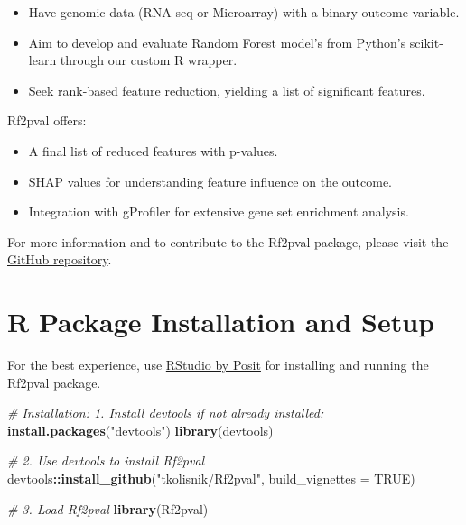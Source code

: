 \documentclass[
]{article}
\newenvironment{Shaded}{\begin{snugshade}}{\end{snugshade}}
\newcommand{\AttributeTok}[1]{\textcolor[rgb]{0.13,0.29,0.53}{#1}}
\newcommand{\CommentTok}[1]{\textcolor[rgb]{0.56,0.35,0.01}{\textit{#1}}}
\newcommand{\ConstantTok}[1]{\textcolor[rgb]{0.56,0.35,0.01}{#1}}
\newcommand{\FunctionTok}[1]{\textcolor[rgb]{0.13,0.29,0.53}{\textbf{#1}}}
\newcommand{\NormalTok}[1]{#1}
\newcommand{\SpecialCharTok}[1]{\textcolor[rgb]{0.81,0.36,0.00}{\textbf{#1}}}
\newcommand{\StringTok}[1]{\textcolor[rgb]{0.31,0.60,0.02}{#1}}
\begin{document}
\begin{itemize}
\item
  Have genomic data (RNA-seq or Microarray) with a binary outcome
  variable.
\item
  Aim to develop and evaluate Random Forest model's from Python's
  scikit-learn through our custom R wrapper.
\item
  Seek rank-based feature reduction, yielding a list of significant
  features.
\end{itemize}

Rf2pval offers:

\begin{itemize}
\item
  A final list of reduced features with p-values.
\item
  SHAP values for understanding feature influence on the outcome.
\item
  Integration with gProfiler for extensive gene set enrichment analysis.
\end{itemize}

For more information and to contribute to the Rf2pval package, please
visit the \href{https://github.com/tkolisnik/Rf2pval}{GitHub
repository}.

\hypertarget{r-package-installation-and-setup}{%
\section{R Package Installation and
Setup}\label{r-package-installation-and-setup}}

For the best experience, use
\href{https://posit.co/products/open-source/rstudio/}{RStudio by Posit}
for installing and running the Rf2pval package.

\begin{Shaded}
\begin{Highlighting}[]
\CommentTok{\# Installation: 1. Install devtools if not already installed:}
\FunctionTok{install.packages}\NormalTok{(}\StringTok{"devtools"}\NormalTok{)}
\FunctionTok{library}\NormalTok{(devtools)}

\CommentTok{\# 2. Use devtools to install Rf2pval}
\NormalTok{devtools}\SpecialCharTok{::}\FunctionTok{install\_github}\NormalTok{(}\StringTok{"tkolisnik/Rf2pval"}\NormalTok{, }\AttributeTok{build\_vignettes =} \ConstantTok{TRUE}\NormalTok{)}

\CommentTok{\# 3. Load Rf2pval}
\FunctionTok{library}\NormalTok{(Rf2pval)}
\end{Highlighting}
\end{Shaded}
\end{document}

